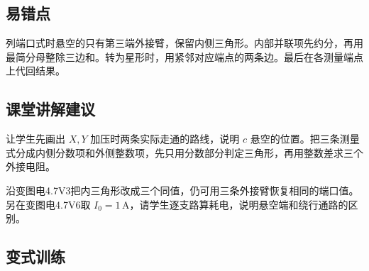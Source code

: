 \documentclass[UTF8,fontset=fandol,a4paper,11pt]{ctexart}
\begin{document}


\subsection*{易错点}

列端口式时悬空的只有第三端外接臂，保留内侧三角形。内部并联项先约分，再用最简分母整除三边和。转为星形时，用紧邻对应端点的两条边。最后在各测量端点上代回结果。



\subsection*{课堂讲解建议}

让学生先画出 $X,Y$ 加压时两条实际走通的路线，说明 $c$ 悬空的位置。把三条测量式分成内侧分数项和外侧整数项，先只用分数部分判定三角形，再用整数差求三个外接电阻。

沿变图电4.7V3把内三角形改成三个同值，仍可用三条外接臂恢复相同的端口值。另在变图电4.7V6取 $I_0=1\,\mathrm A$，请学生逐支路算耗电，说明悬空端和绕行通路的区别。


\subsection*{变式训练}
\end{document}
